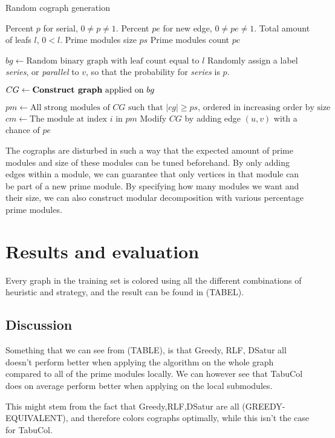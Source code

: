 \documentclass{amsart}
\begin{document}
\begin{algorithm}[H]
    \caption{Random cograph generation}
  \begin{algorithmic}[1]
      \REQUIRE Percent $p$ for serial, $0 \neq p \neq 1$.
      \REQUIRE Percent $pe$ for new  edge, $0 \neq pe \neq 1$.
      \REQUIRE Total amount of leafs $l$, $0 < l$.
      \REQUIRE Prime modules size $ps$
      \REQUIRE Prime modules count $pc$

      \STATE $bg \leftarrow \text{Random binary graph with leaf count equal to $l$}$
        \STATE Randomly assign a label  \textit{series}, or \textit{parallel} to $v$, so
        that the probability for \textit{series} is $p$.
      \ENDFOR

      \STATE $CG \leftarrow \text{\textbf{Construct graph} applied on $bg$}$

      \STATE $pm \leftarrow \text{All strong modules of $CG$ such that $|cg| \geq ps$, ordered in increasing order by size}$
        \STATE $cm \leftarrow \text{The module at index $i$ in $pm$}$
            \STATE Modify $CG$ by adding edge $(u,v)$ with a chance of $pe$
        \ENDFOR
      \ENDFOR
  \end{algorithmic}
\end{algorithm}

The cographs are disturbed in such a way that the expected amount of prime
modules and size of these modules can be tuned beforehand. By only adding edges
within a module, we can guarantee that only vertices in that module can be part
of a new prime module. By specifying how many modules we want and their size, we
can also construct modular decomposition with various percentage prime modules.


\section{Results and evaluation}
\label{sec:Result}
Every graph in the training set is colored using all the different combinations
of heuristic and strategy, and the result can be found in (TABEL).






\subsection{Discussion}

Something that we can see from (TABLE), is that Greedy, RLF, DSatur all doesn't
perform better when applying the algorithm on the whole graph compared to all of
the prime modules locally. We can however see that TabuCol does on average
perform better when applying on the local submodules.

This might stem from the fact that Greedy,RLF,DSatur are all
(GREEDY-EQUIVALENT), and therefore colors cographs optimally, while this isn't
the case for TabuCol.

\printbibliography
\end{document}

